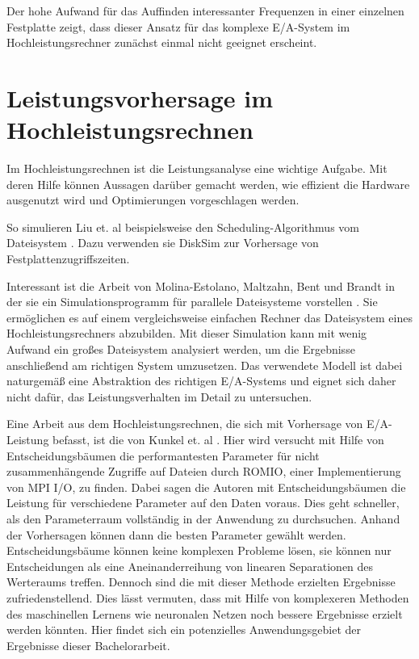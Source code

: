 \documentclass[
	12pt,
	a4paper,
	BCOR10mm,
	DIV14,
	listof=totoc,
	bibliography=totoc,
	headsepline
]{scrreprt}
\begin{document}
Der hohe Aufwand für das Auffinden interessanter Frequenzen in einer einzelnen Festplatte zeigt, dass dieser Ansatz für das komplexe E/A-System im Hochleistungsrechner zunächst einmal nicht geeignet erscheint.

\section{Leistungsvorhersage im Hochleistungsrechnen}
\label{rel_vorhersage_im-hpc}
Im Hochleistungsrechnen ist die Leistungsanalyse eine wichtige Aufgabe. Mit deren Hilfe können Aussagen darüber gemacht werden, wie effizient die Hardware ausgenutzt wird und Optimierungen vorgeschlagen werden. 

So simulieren Liu et. al beispielsweise den Scheduling-Algorithmus vom Dateisystem \cite{liu2011towards}. Dazu verwenden sie DiskSim \cite{Bucy08thedisksim} zur Vorhersage von Festplattenzugriffszeiten.

Interessant ist die Arbeit von Molina-Estolano, Maltzahn, Bent und Brandt in der sie ein Simulationsprogramm für parallele Dateisysteme vorstellen \cite{molina2009building}. Sie ermöglichen es auf einem vergleichsweise einfachen Rechner das Dateisystem eines Hochleistungsrechners abzubilden. Mit dieser Simulation kann mit wenig Aufwand ein großes Dateisystem analysiert werden, um die Ergebnisse anschließend am richtigen System umzusetzen. Das verwendete Modell ist dabei naturgemäß eine Abstraktion des richtigen E/A-Systems und eignet sich daher nicht dafür, das Leistungsverhalten im Detail zu untersuchen.

Eine Arbeit aus dem Hochleistungsrechnen, die sich mit Vorhersage von E/A-Leistung befasst, ist die von Kunkel et. al \cite{UMLTPTPONI15}. Hier wird versucht mit Hilfe von Entscheidungsbäumen die performantesten Parameter für nicht zusammenhängende Zugriffe auf Dateien durch ROMIO, einer Implementierung von MPI I/O, zu finden.
Dabei sagen die Autoren mit Entscheidungsbäumen die Leistung für verschiedene Parameter auf den Daten voraus. Dies geht schneller, als den Parameterraum vollständig in der Anwendung zu durchsuchen. Anhand der Vorhersagen können dann die besten Parameter gewählt werden.
Entscheidungsbäume können keine komplexen Probleme lösen, sie können nur Entscheidungen als eine Aneinanderreihung von linearen Separationen des Werteraums treffen. Dennoch sind die mit dieser Methode erzielten Ergebnisse zufriedenstellend. Dies lässt vermuten, dass mit Hilfe von komplexeren Methoden des maschinellen Lernens wie neuronalen Netzen noch bessere Ergebnisse erzielt werden könnten.
Hier findet sich ein potenzielles Anwendungsgebiet der Ergebnisse dieser Bachelorarbeit.
\end{document}
